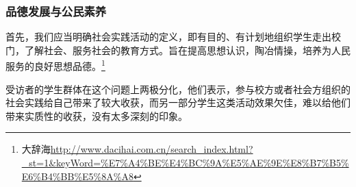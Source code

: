 \documentclass[12pt,UTF8]{ctexart}
\begin{document}
\subsubsection {品德发展与公民素养}
\par {
	
	首先，我们应当明确社会实践活动的定义，即有目的、有计划地组织学生走出校门，了解社会、服务社会的教育方式。旨在提高思想认识，陶冶情操，培养为人民服务的良好思想品德。\footnote{大辞海\url{http://www.dacihai.com.cn/search_index.html?_st=1&keyWord=\%E7\%A4\%BE\%E4\%BC\%9A\%E5\%AE\%9E\%E8\%B7\%B5\%E6\%B4\%BB\%E5\%8A\%A8}}
}
\par {
	
	受访者的学生群体在这个问题上两极分化，他们表示，参与校方或者社会方组织的社会实践给自己带来了较大收获，而另一部分学生这类活动效果欠佳，难以给他们带来实质性的收获，没有太多深刻的印象。
}
\end{document}
